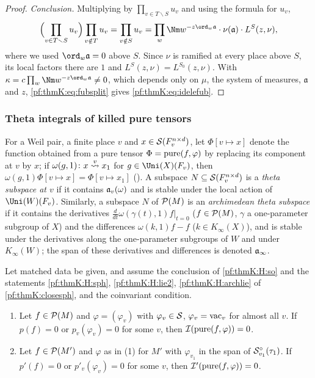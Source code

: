 \begin{proof}
\emph{Conclusion.} Multiplying by $\prod_{v\in T\smallsetminus S}u_v$ and using the formula for $u_v$,
\[
\Bigl(\prod_{v\in T\smallsetminus S}u_v\Bigr)\prod_{v\notin T}u_v=\prod_{v\notin S}u_v
=\prod_{w}\Nm w^{-z\ord_w\mathfrak a}\cdot\nu(\mathfrak a)\cdot L^S(z,\nu),
\]
where we used $\ord_w\mathfrak a=0$ above $S$. Since $\nu$ is ramified at every place above $S$, its local factors there
are $1$ and $L^S(z,\nu)=L^{S_0}(z,\nu)$. With $\kappa=c\prod_w\Nm w^{-z\ord_w\mathfrak a}\ne0$, which depends only on
$\mu$, the system of measures, $\mathfrak a$ and $z$, \eqref{pf:thmK:eq:fubsplit} gives \eqref{pf:thmK:eq:idelefub}.
\end{proof}

\subsubsection{Theta integrals of killed pure tensors}\label{sec:pf:thmK:kills}
For a Weil pair, a finite place $v$ and $x\in\mathcal{S}(F_v^{n\times d})$, let $\Phi[v\mapsto x]$ denote the function obtained
from a pure tensor $\Phi=\operatorname{pure}(f,\varphi)$ by replacing its component at $v$ by $x$; if $\omega(g,1)\colon x\mathrel{\stackrel{v}{\leadsto}}
x_1$ for $g\in\Uni(X)(F_v)$, then $\omega(g,1)\Phi[v\mapsto x]=\Phi[v\mapsto x_1]$
(). A subspace $N\subseteq\mathcal{S}(F_v^{n\times d})$ is a
\emph{theta subspace at $v$} if it contains $\mathfrak{a}_v(\omega)$ and is stable under the local action of $\Uni(W)(F_v)$.
Similarly, a subspace $N$ of $\mathcal{P}(M)$ is an \emph{archimedean theta subspace} if it contains the derivatives
$\frac{d}{dt}\omega(\gamma(t),1)f|_{t=0}$ ($f\in\mathcal{P}(M)$, $\gamma$ a one-parameter subgroup of $X$) and the differences
$\omega(k,1)f-f$ ($k\in K_\infty(X)$), and is stable under the derivatives along the one-parameter subgroups of $W$ and
under $K_\infty(W)$; the span of these derivatives and differences is denoted $\mathfrak{a}_\infty$.

\begin{proposition}\label{pf:thmK:kills}
Let matched data be given, and assume the conclusion of \ref{pf:thmK:H:so} and the statements \ref{pf:thmK:H:sph},
\ref{pf:thmK:H:lie2}, \ref{pf:thmK:H:archlie} of \cref{pf:thmK:closesph}, and the coinvariant condition.
\begin{enumerate}
\item Let $f\in\mathcal{P}(M)$ and $\varphi=(\varphi_v)$ with $\varphi_v\in\mathcal{S}$, $\varphi_v=\mathrm{vac}_v$ for almost all
$v$. If $p(f)=0$ or $p_v(\varphi_v)=0$ for some $v$, then $\mathcal{I}(\operatorname{pure}(f,\varphi))=0$.
\item Let $f\in\mathcal{P}(M')$ and $\varphi$ as in (1) for $M'$ with $\varphi_{v_1}$ in the span of $\mathcal{S}^{\circ}_{v_1}(\tau_1)$.
If $p'(f)=0$ or $p'_v(\varphi_v)=0$ for some $v$, then $\mathcal{I}'(\operatorname{pure}(f,\varphi))=0$.
\end{enumerate}
\end{proposition}

